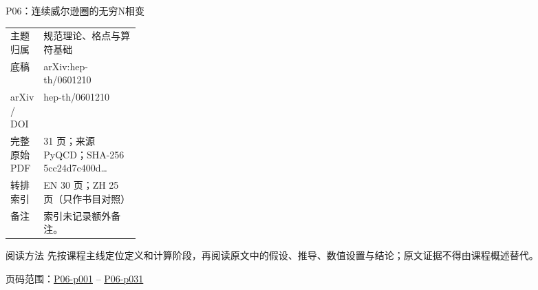 \documentclass[aspectratio=169,10pt]{ctexbeamer}
\begin{document}
\begin{frame}[t]{P06：连续威尔逊圈的无穷N相变}
\small\begin{tabularx}{\linewidth}{p{0.22\linewidth}Y}
\toprule 主题归属 & 规范理论、格点与算符基础\\
底稿 & arXiv:hep-th/\allowbreak{}0601210\\
arXiv / DOI & hep-th/\allowbreak{}0601210\\
完整原始 PDF & 31 页；来源 PyQCD；SHA-256 5cc24d7c400d\ldots\\
转排索引 & EN 30 页；ZH 25 页（只作书目对照）\\
备注 & 索引未记录额外备注。\\
\bottomrule\end{tabularx}\vspace{0.25cm}
\begin{block}{阅读方法}
先按课程主线定位定义和计算阶段，再阅读原文中的假设、推导、数值设置与结论；原文证据不得由课程概述替代。
\end{block}
\vfill 页码范围：\hyperlink{P06-p001}{P06-p001} -- \hyperlink{P06-p031}{P06-p031}
\end{frame}
\end{document}
